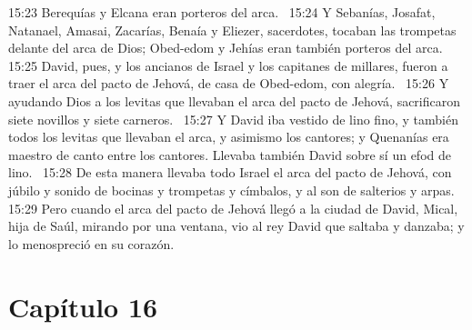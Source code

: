 15:23 Berequías y Elcana eran porteros del arca.  
15:24 Y Sebanías, Josafat, Natanael, Amasai, Zacarías, Benaía y Eliezer, sacerdotes, tocaban las trompetas delante del arca de Dios; Obed-edom y Jehías eran también porteros del arca.  
15:25 David, pues, y los ancianos de Israel y los capitanes de millares, fueron a traer el arca del pacto de Jehová, de casa de Obed-edom, con alegría.  
15:26 Y ayudando Dios a los levitas que llevaban el arca del pacto de Jehová, sacrificaron siete novillos y siete carneros.  
15:27 Y David iba vestido de lino fino, y también todos los levitas que llevaban el arca, y asimismo los cantores; y Quenanías era maestro de canto entre los cantores. Llevaba también David sobre sí un efod de lino.  
15:28 De esta manera llevaba todo Israel el arca del pacto de Jehová, con júbilo y sonido de bocinas y trompetas y címbalos, y al son de salterios y arpas.  
15:29 Pero cuando el arca del pacto de Jehová llegó a la ciudad de David, Mical, hija de Saúl, mirando por una ventana, vio al rey David que saltaba y danzaba; y lo menospreció en su corazón.  
\section*{Capítulo 16}

